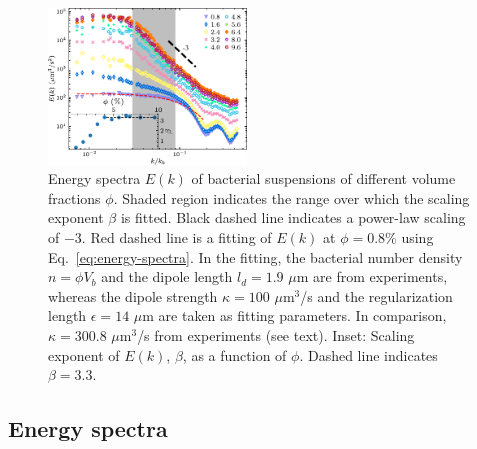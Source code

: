 \documentclass[twocolumn,aps,prx,amsmath,amssymb,longbibliography]{revtex4-2}
\begin{document}
\begin{figure}[t]
\begin{center}\includegraphics[width=0.47\textwidth]{Figures/fig-4.pdf}
\caption[Concentration dependence of energy spectra.]
{
Energy spectra $E(k)$ of bacterial suspensions of different volume fractions $\phi$. Shaded region indicates the range over which the scaling exponent $\beta$ is fitted. Black dashed line indicates a power-law scaling of $-3$. Red dashed line is a fitting of $E(k)$ at $\phi=0.8\%$ using Eq.~\ref{eq:energy-spectra}. In the fitting, the bacterial number density $n=\phi V_b$ and the dipole length $l_d = 1.9$ $\mu$m are from experiments, whereas the dipole strength $\kappa = 100$ $\mu$m$^3$/s and the regularization length $\epsilon = 14$ $\mu$m are taken as fitting parameters. In comparison, $\kappa = 300.8$ $\mu$m$^3$/s from experiments (see text).
Inset: Scaling exponent of $E(k)$, $\beta$, as a function of $\phi$. Dashed line indicates $\beta = 3.3$.
}
\label{fig:energy-spectra}
\end{center}
\end{figure}

\subsection{Energy spectra}
\end{document}
